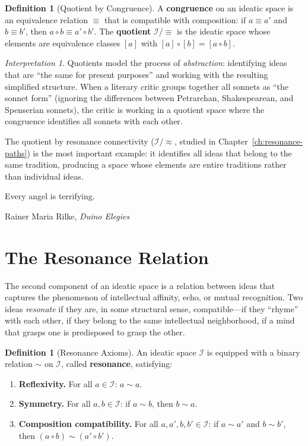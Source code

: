 \documentclass[11pt,openany]{book}
\theoremstyle{definition}
\newtheorem{definition}[axiom]{Definition}
\theoremstyle{plain}
\theoremstyle{remark}
\newtheorem{interpretation}[axiom]{Interpretation}
\newcommand{\IS}{\mathcal{I}}               %
\newcommand{\compose}{\circ}                 %
\newcommand{\res}{\sim}                      %
\begin{document}
\begin{definition}[Quotient by Congruence]
A \textbf{congruence} on an ideatic space is an equivalence relation $\equiv$ that is compatible with composition: if $a \equiv a'$ and $b \equiv b'$, then $a \compose b \equiv a' \compose b'$. The \textbf{quotient} $\IS/{\equiv}$ is the ideatic space whose elements are equivalence classes $[a]$ with $[a] \compose [b] = [a \compose b]$.
\end{definition}

\begin{interpretation}
Quotients model the process of \emph{abstraction}: identifying ideas that are ``the same for present purposes'' and working with the resulting simplified structure. When a literary critic groups together all sonnets as ``the sonnet form'' (ignoring the differences between Petrarchan, Shakespearean, and Spenserian sonnets), the critic is working in a quotient space where the congruence identifies all sonnets with each other.

The quotient by resonance connectivity ($\IS/{\approx}$, studied in Chapter~\ref{ch:resonance-paths}) is the most important example: it identifies all ideas that belong to the same tradition, producing a space whose elements are entire traditions rather than individual ideas.
\end{interpretation}


\label{ch:resonance}

\epigraph{Every angel is terrifying.}{Rainer Maria Rilke, \textit{Duino Elegies}}

\section{The Resonance Relation}

The second component of an ideatic space is a relation between ideas that captures the phenomenon of intellectual affinity, echo, or mutual recognition. Two ideas \emph{resonate} if they are, in some structural sense, compatible---if they ``rhyme'' with each other, if they belong to the same intellectual neighborhood, if a mind that grasps one is predisposed to grasp the other.

\begin{definition}[Resonance Axioms]
\label{def:resonance}
An ideatic space $\IS$ is equipped with a binary relation $\res$ on $\IS$, called \textbf{resonance}, satisfying:
\begin{enumerate}
\item[\textbf{(R1)}] \textbf{Reflexivity.} For all $a \in \IS$: $a \res a$.
\item[\textbf{(R2)}] \textbf{Symmetry.} For all $a, b \in \IS$: if $a \res b$, then $b \res a$.
\item[\textbf{(R3)}] \textbf{Composition compatibility.} For all $a, a', b, b' \in \IS$: if $a \res a'$ and $b \res b'$, then $(a \compose b) \res (a' \compose b')$.
\end{enumerate}
\end{definition}
\end{document}
